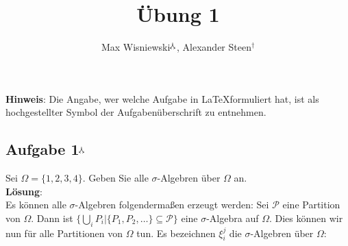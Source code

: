 \documentclass[11pt,a4paper,ngerman]{article}
\date{}
\title{Übung 1}
\author{Max Wisniewski$^\curlywedgedownarrow$, Alexander Steen$^\dagger$}
\newcommand{\set}[1]{ \{ #1 \}}
\begin{document}

\renewcommand{\figurename}{Figure}

\maketitle
\thispagestyle{fancy}

\begin{center}
\textbf{Hinweis}: Die Angabe, wer welche Aufgabe in \LaTeX formuliert hat, ist als hochgestellter Symbol der Aufgabenüberschrift zu entnehmen.
\end{center}


\subsection*{Aufgabe 1$^\curlywedgedownarrow$}
Sei $\Omega = \{1,2,3,4\}$. Geben Sie alle $\sigma$-Algebren über $\Omega$ an. \\

\textbf{Lösung}: \\
Es können alle $\sigma$-Algebren folgendermaßen erzeugt werden: Sei $\mathcal{P}$ eine Partition von $\Omega$. Dann ist $\set{\bigcup_i P_i|\set{P_1,P_2,\ldots} \subseteq \mathcal{P}}$ eine $\sigma$-Algebra auf $\Omega$. Dies können wir nun für alle Partitionen von $\Omega$ tun. Es bezeichnen $\xi^j_i$ die $\sigma$-Algebren über $\Omega$: \\
\end{document}
